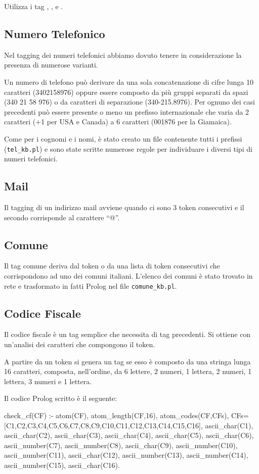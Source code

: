 Utilizza i tag , , e .

\subsection{Numero Telefonico}
Nel tagging dei numeri telefonici abbiamo dovuto tenere in considerazione la presenza di numerose varianti.

Un numero di telefono può derivare da una sola concatenazione di cifre lunga 10 caratteri (3402158976) oppure essere composto da più gruppi separati da spazi (340 21 58 976) o da caratteri di separazione (340-215.8976). Per ognuno dei casi precedenti può essere presente o meno un prefisso internazionale che varia da 2 caratteri (+1 per USA e Canada) a 6 caratteri (001876 per la Giamaica).

Come per i cognomi e i nomi, è stato creato un file contenente tutti i prefissi (\verb|tel_kb.pl|) e sono state scritte numerose regole per individuare i diversi tipi di numeri telefonici.

\subsection{Mail}
Il tagging di un indirizzo mail avviene quando ci sono 3 token consecutivi e il secondo corrisponde al carattere ``@''.

\subsection{Comune}
Il tag comune deriva dal token o da una lista di token consecutivi che corrispondono ad uno dei comuni italiani. L'elenco dei comuni è stato trovato in rete e trasformato in fatti Prolog nel file \verb|comune_kb.pl|.

\subsection{Codice Fiscale}
Il codice fiscale è un tag semplice che necessita di tag precedenti. Si ottiene con un'analisi dei caratteri che compongono il token.

A partire da un token si genera un tag  se esso è composto da una stringa lunga 16 caratteri, composta, nell'ordine, da 6 lettere, 2 numeri, 1 lettera, 2 numeri, 1 lettera, 3 numeri e 1 lettera.

Il codice Prolog scritto è il seguente:

\begin{prologcode}
check_cf(CF) :-
  atom(CF),
  atom_length(CF,16),
  atom_codes(CF,CFs),
  CFs=[C1,C2,C3,C4,C5,C6,C7,C8,C9,C10,C11,C12,C13,C14,C15,C16],
  ascii_char(C1),
  ascii_char(C2),
  ascii_char(C3),
  ascii_char(C4),
  ascii_char(C5),
  ascii_char(C6),
  ascii_number(C7),
  ascii_number(C8),
  ascii_char(C9),
  ascii_number(C10),
  ascii_number(C11),
  ascii_char(C12),
  ascii_number(C13),
  ascii_number(C14),
  ascii_number(C15),
  ascii_char(C16).
\end{prologcode}